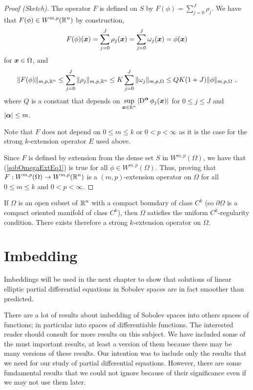\begin{proof}[Proof (Sketch)]
The operator $F$ is defined on $S$ by
$\displaystyle F(\phi) = \sum_{j=0}^J \rho_j$.
We have that $\displaystyle F(\phi) \in W^{m,p}(\mathbb{R}^n)$ by construction,
\[
  F(\phi)({\bm{x}}) = \sum_{j=0}^J \rho_j({\bm{x}})
  = \sum_{j=0}^J \omega_j({\bm{x}}) = \phi({\bm{x}})
\]
for ${\bm{x}} \in \Omega$, and
\begin{equation}\label{sobOmegaExtEq1}
\|F(\phi)\|_{m,p,\mathbb{R}^n} \leq \sum_{j=0}^J \|\rho_j\|_{m,p,\mathbb{R}^n}
\leq K \sum_{j=0}^J \|\omega_j\|_{m,p,\Omega}
\leq QK(1+J)  \|\phi\|_{m,p,\Omega} \ ,
\end{equation}
where $Q$ is a constant that depends on
$\displaystyle \sup_{{\bm{x}} \in \mathbb{R}^n}
\left|\operatorname{D}^{{\bm{\alpha}}} \phi_j({\bm{x}}) \right|$
for $0 \leq j \leq J$ and $|{\bm{\alpha}}| \leq m$.

Note that $F$ does not depend on $0 \leq m \leq k$ or $0 < p < \infty$
as it is the case for the strong $k$-extension operator $E$ used
above.

Since $F$ is defined by extension from the dense set $S$ in
$\displaystyle W^{m,p}(\Omega)$, we have that
(\ref{sobOmegaExtEq1}) is true for all
$\displaystyle \phi \in W^{m,p}(\Omega)$.  Thus, proving that
$\displaystyle F: W^{m,p}(\Omega) \to W^{m,p}(\mathbb{R}^n)$ is a $(m,p)$-extension
operator on $\displaystyle \Omega$ for all
$0\leq m \leq k$ and $0<p<\infty$.
\end{proof}


If $\Omega$ is an open subset of $\displaystyle \mathbb{R}^n$ with a compact
boundary of class $\displaystyle C^k$ (so $\partial \Omega$ is a
compact oriented manifold of class $\displaystyle C^k$),  then
$\Omega$ satisfies the uniform $\displaystyle C^k$-regularity 
condition.  There exists therefore a strong $k$-extension operator on
$\Omega$.

\section{Imbedding}

Imbeddings will be used in the next chapter to show that solutions of
linear elliptic partial differential equations in Sobolev spaces
are in fact smoother than predicted.

There are a lot of results about imbedding of Sobolev spaces into
others spaces of functions; in particular into spaces of
differentiable functions.  The interested reader should consult
\cite{Ad} for more results on this subject.  We have included some of
the must important results, at least a version of them because there
may be many versions of these results.  Our intention was to include
only the results that we need for our study of partial differential
equations.  However, there are some fundamental results that we could
not ignore because of their significance even if we may not use them
later.

